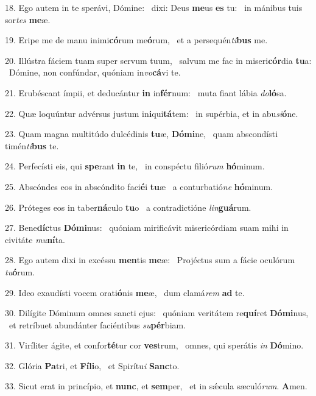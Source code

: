 18. Ego autem in te sperávi, Dómine: \dag\  dixi: Deus \textbf{me}us \textbf{es} tu: \ast\  in mánibus tuis sor\textit{tes} \textbf{me}æ.\

19. Eripe me de manu inimi\textbf{có}rum me\textbf{ó}rum, \ast\  et a persequén\textit{ti}\textbf{bus} me.\

20. Illústra fáciem tuam super servum tuum, \dag\  salvum me fac in miseri\textbf{cór}dia \textbf{tu}a: \ast\  Dómine, non confúndar, quóniam in\textit{vo}\textbf{cá}vi te.\

21. Erubéscant ímpii, et deducántur \textbf{in} in\textbf{fér}num: \ast\  muta fiant lábia \textit{do}\textbf{ló}sa.\

22. Quæ loquúntur advérsus justum in\textbf{i}qui\textbf{tá}tem: \ast\  in supérbia, et in abu\textit{si}\textbf{ó}ne.\

23. Quam magna multitúdo dulcédinis \textbf{tu}æ, \textbf{Dó}\textbf{mi}ne, \ast\  quam abscondísti timén\textit{ti}\textbf{bus} te.\

24. Perfecísti eis, qui \textbf{spe}rant \textbf{in} te, \ast\  in conspéctu filió\textit{rum} \textbf{hó}minum.\

25. Abscóndes eos in abscóndito faci\textbf{é}i \textbf{tu}æ \ast\  a conturbatió\textit{ne} \textbf{hó}minum.\

26. Próteges eos in taber\textbf{ná}culo \textbf{tu}o \ast\  a contradictióne \textit{lin}\textbf{guá}rum.\

27. Bene\textbf{díc}tus \textbf{Dó}\textbf{mi}nus: \ast\  quóniam mirificávit misericórdiam suam mihi in civitáte \textit{mu}\textbf{ní}ta.\

28. Ego autem dixi in excéssu \textbf{men}tis \textbf{me}æ: \ast\  Projéctus sum a fácie oculórum \textit{tu}\textbf{ó}rum.\

29. Ideo exaudísti vocem orati\textbf{ó}nis \textbf{me}æ, \ast\  dum clamá\textit{rem} \textbf{ad} te.\

30. Dilígite Dóminum omnes sancti ejus: \dag\  quóniam veritátem re\textbf{quí}ret \textbf{Dó}\textbf{mi}nus, \ast\  et retríbuet abundánter faciéntibus \textit{su}\textbf{pér}biam.\

31. Viríliter ágite, et confor\textbf{té}tur cor \textbf{ves}trum, \ast\  omnes, qui sperátis \textit{in} \textbf{Dó}mino.\

32. Glória \textbf{Pa}tri, et \textbf{Fí}\textbf{li}o, \ast\  et Spirítu\textit{i} \textbf{Sanc}to.\

33. Sicut erat in princípio, et \textbf{nunc}, et \textbf{sem}per, \ast\  et in sǽcula sæculó\textit{rum}. \textbf{A}men.\

